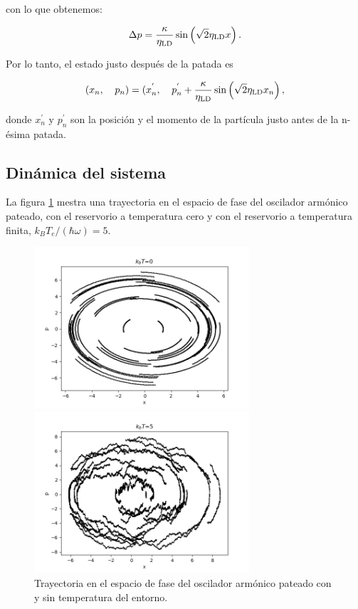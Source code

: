 \documentclass[letterpaper,12pt,oneside]{book}
\begin{document}
	\noindent con lo que obtenemos:
	
	\begin{equation}
		\Delta p = \frac{\kappa}{\eta_{\rm LD}} \sin \left(\sqrt{2} \eta_{\rm LD} x \right).
	\end{equation}
	
	Por lo tanto,  el estado justo despu\'es de la patada es
	
	\begin{equation}\label{EfectoPatada}
		(x_n,\verb|  | p_n) = (x_n^{'}, \verb|  | p_n^{'} +  \frac{\kappa}{\eta_{\rm LD}} \sin \left(\sqrt{2} \eta_{\rm LD} x_n \right),
	\end{equation}
	
	\noindent donde $x_n^{'}$ y $p_n^{'}$ son la posici\'on y el momento de la part\'icula justo antes de la n-\'esima patada.
	
	\subsection{Din\'amica del sistema}
	
	La figura \ref{fig.Temp0vsTempFinita} mestra una trayectoria en el espacio de fase del oscilador arm\'onico pateado, con el reservorio a temperatura cero y con el reservorio a temperatura finita, $k_BT_e/(\hbar\omega) = 5$.
	
	\begin{figure} [h!]
		\centering 
		\begin{minipage}{0.45\textwidth}
			\centering 
			\includegraphics[width=8cm]{Figures/noT}
		\end{minipage}
		\begin{minipage}{0.45\textwidth}
			\centering 
			\includegraphics[width=8cm]{Figures/10T}
		\end{minipage}
		
		\caption{Trayectoria en el espacio de fase del oscilador armónico pateado con y sin temperatura del entorno.}
		\label{fig.Temp0vsTempFinita}
	\end{figure}
	
\end{document}
